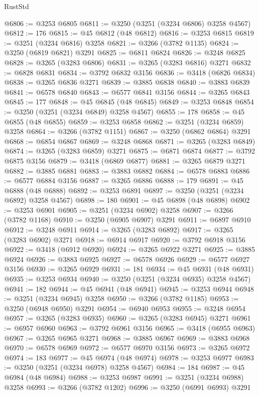 \begin{lexlean}{RustStd}
\begin{coremodule}
@6806 := @3253 @6805
@6811 := @3250 (@3251 (@3234 @6806) @3258 @4567)
@6812 := 176
@6815 := @45 @6812 (@48 @6812)
@6816 := @3253 @6815
@6819 := @3251 (@3234 @6816) @3258
@6821 := @3266 (@3782 @1135)
@6824 := @3250 (@6819 @6821) @3291
@6825 := @6811 @6824
@6826 := @3248 @6825
@6828 := @3265 (@3283 @6806)
@6831 := @3265 (@3283 @6816) @3271
@6832 := @6828 @6831
@6834 := @3792 @6832 @3156
@6836 := @3418 (@6826 @6834)
@6838 := @3265 @6836 @3271
@6839 := @3885 @6838
@6840 := @3883 @6839
@6841 := @6578 @6840
@6843 := @6577 @6841 @3156
@6844 := @3265 @6843
@6845 := 177
@6848 := @45 @6845 (@48 @6845)
@6849 := @3253 @6848
@6854 := @3250 (@3251 (@3234 @6849) @3258 @4567)
@6855 := 178
@6858 := @45 @6855 (@48 @6855)
@6859 := @3253 @6858
@6862 := @3251 (@3234 @6859) @3258
@6864 := @3266 (@3782 @1151)
@6867 := @3250 (@6862 @6864) @3291
@6868 := @6854 @6867
@6869 := @3248 @6868
@6871 := @3265 (@3283 @6849)
@6874 := @3265 (@3283 @6859) @3271
@6875 := @6871 @6874
@6877 := @3792 @6875 @3156
@6879 := @3418 (@6869 @6877)
@6881 := @3265 @6879 @3271
@6882 := @3885 @6881
@6883 := @3883 @6882
@6884 := @6578 @6883
@6886 := @6577 @6884 @3156
@6887 := @3265 @6886
@6888 := 179
@6891 := @45 @6888 (@48 @6888)
@6892 := @3253 @6891
@6897 := @3250 (@3251 (@3234 @6892) @3258 @4567)
@6898 := 180
@6901 := @45 @6898 (@48 @6898)
@6902 := @3253 @6901
@6905 := @3251 (@3234 @6902) @3258
@6907 := @3266 (@3782 @1168)
@6910 := @3250 (@6905 @6907) @3291
@6911 := @6897 @6910
@6912 := @3248 @6911
@6914 := @3265 (@3283 @6892)
@6917 := @3265 (@3283 @6902) @3271
@6918 := @6914 @6917
@6920 := @3792 @6918 @3156
@6922 := @3418 (@6912 @6920)
@6924 := @3265 @6922 @3271
@6925 := @3885 @6924
@6926 := @3883 @6925
@6927 := @6578 @6926
@6929 := @6577 @6927 @3156
@6930 := @3265 @6929
@6931 := 181
@6934 := @45 @6931 (@48 @6931)
@6935 := @3253 @6934
@6940 := @3250 (@3251 (@3234 @6935) @3258 @4567)
@6941 := 182
@6944 := @45 @6941 (@48 @6941)
@6945 := @3253 @6944
@6948 := @3251 (@3234 @6945) @3258
@6950 := @3266 (@3782 @1185)
@6953 := @3250 (@6948 @6950) @3291
@6954 := @6940 @6953
@6955 := @3248 @6954
@6957 := @3265 (@3283 @6935)
@6960 := @3265 (@3283 @6945) @3271
@6961 := @6957 @6960
@6963 := @3792 @6961 @3156
@6965 := @3418 (@6955 @6963)
@6967 := @3265 @6965 @3271
@6968 := @3885 @6967
@6969 := @3883 @6968
@6970 := @6578 @6969
@6972 := @6577 @6970 @3156
@6973 := @3265 @6972
@6974 := 183
@6977 := @45 @6974 (@48 @6974)
@6978 := @3253 @6977
@6983 := @3250 (@3251 (@3234 @6978) @3258 @4567)
@6984 := 184
@6987 := @45 @6984 (@48 @6984)
@6988 := @3253 @6987
@6991 := @3251 (@3234 @6988) @3258
@6993 := @3266 (@3782 @1202)
@6996 := @3250 (@6991 @6993) @3291

\end{coremodule}
\end{lexlean}
